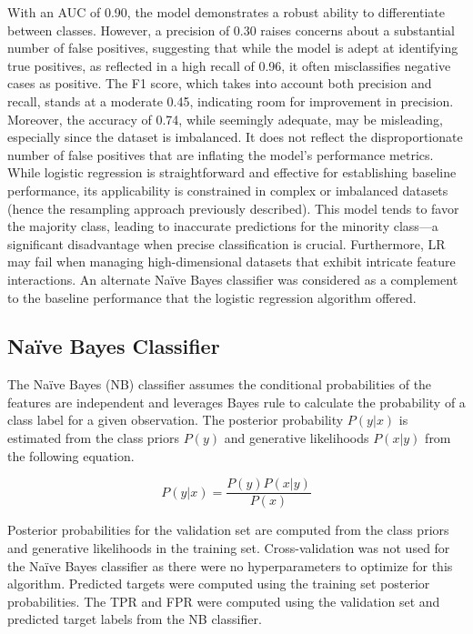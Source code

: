 \documentclass[11pt]{article}
\begin{document}
With an AUC of 0.90, the model demonstrates a robust ability to differentiate between classes. However, a precision of 0.30 raises concerns about a substantial number of false positives, suggesting that while the model is adept at identifying true positives, as reflected in a high recall of 0.96, it often misclassifies negative cases as positive. The F1 score, which takes into account both precision and recall, stands at a moderate 0.45, indicating room for improvement in precision. Moreover, the accuracy of 0.74, while seemingly adequate, may be misleading, especially since the dataset is imbalanced. It does not reflect the disproportionate number of false positives that are inflating the model's performance metrics. \\
 
While logistic regression is straightforward and effective for establishing baseline performance, its applicability is constrained in complex or imbalanced datasets (hence the resampling approach previously described). This model tends to favor the majority class, leading to inaccurate predictions for the minority class—a significant disadvantage when precise classification is crucial. Furthermore, LR may fail when managing high-dimensional datasets that exhibit intricate feature interactions. An alternate Naïve Bayes classifier was considered as a complement to the baseline performance that the logistic regression algorithm offered.  

\subsection{Naïve Bayes Classifier}
\label{SS:4-2}

The Naïve Bayes (NB) classifier assumes the conditional probabilities of the features are independent and leverages Bayes rule to calculate the probability of a class label for a given observation. 
The posterior probability $P(y|x)$ is estimated from the class priors $P(y)$ and generative likelihoods $P(x|y)$ from the following equation. 

\begin{equation}
P(y|x)=\frac{P(y)P(x|y)}{P(x)}
\label{eqB}
\end{equation}

Posterior probabilities for the validation set are computed from the class priors and generative likelihoods in the training set. 
Cross-validation was not used for the Naïve Bayes classifier as there were no hyperparameters to optimize for this algorithm. 
Predicted targets were computed using the training set posterior probabilities.
The TPR and FPR were computed using the validation set and predicted target labels from the NB classifier.
\end{document}
